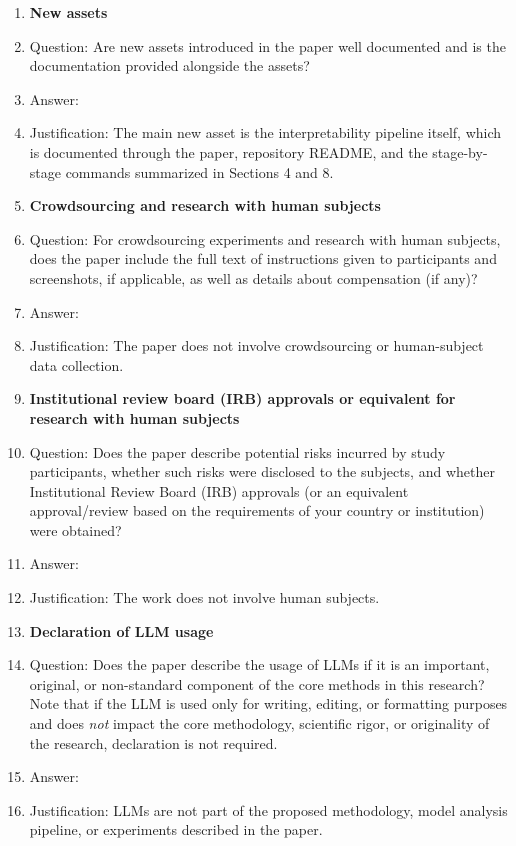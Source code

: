 \begin{enumerate}
\item {\bf New assets}
    \item[] Question: Are new assets introduced in the paper well documented and is the documentation provided alongside the assets?
    \item[] Answer: \answerYes{}
    \item[] Justification: The main new asset is the interpretability pipeline itself, which is documented through the paper, repository README, and the stage-by-stage commands summarized in Sections 4 and 8.

\item {\bf Crowdsourcing and research with human subjects}
    \item[] Question: For crowdsourcing experiments and research with human subjects, does the paper include the full text of instructions given to participants and screenshots, if applicable, as well as details about compensation (if any)?
    \item[] Answer: \answerNA{}
    \item[] Justification: The paper does not involve crowdsourcing or human-subject data collection.

\item {\bf Institutional review board (IRB) approvals or equivalent for research with human subjects}
    \item[] Question: Does the paper describe potential risks incurred by study participants, whether such risks were disclosed to the subjects, and whether Institutional Review Board (IRB) approvals (or an equivalent approval/review based on the requirements of your country or institution) were obtained?
    \item[] Answer: \answerNA{}
    \item[] Justification: The work does not involve human subjects.

\item {\bf Declaration of LLM usage}
    \item[] Question: Does the paper describe the usage of LLMs if it is an important, original, or non-standard component of the core methods in this research? Note that if the LLM is used only for writing, editing, or formatting purposes and does \emph{not} impact the core methodology, scientific rigor, or originality of the research, declaration is not required.
    \item[] Answer: \answerNA{}
    \item[] Justification: LLMs are not part of the proposed methodology, model analysis pipeline, or experiments described in the paper.

\end{enumerate}
